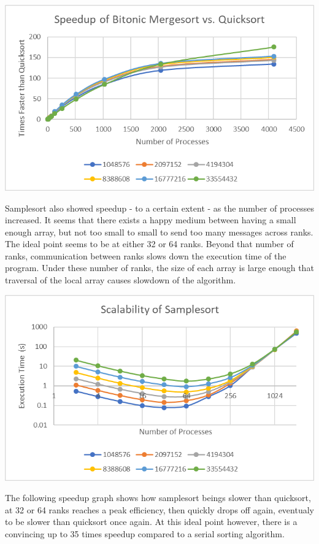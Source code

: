 \documentclass[10pt,letterpaper]{article}
\begin{document}
\begin{multicols}{2}
\begin{center}
\includegraphics[scale=1.3]{bitonic_speedup}
\end{center}

Samplesort also showed speedup - to a certain extent - as the number of processes increased. It seems that there exists a happy medium between having a small enough array, but not too small to small to send too many messages across ranks. The ideal point seems to be at either 32 or 64 ranks. Beyond that number of ranks, communication between ranks slows down the execution time of the program. Under these number of ranks, the size of each array is large enough that traversal of the local array causes slowdown of the algorithm.

\begin{center}
\includegraphics[scale=1.3]{sample_scale}
\end{center}

The following speedup graph shows how samplesort beings slower than quicksort, at 32 or 64 ranks reaches a peak efficiency, then quickly drops off again, eventualy to be slower than quicksort once again. At this ideal point however, there is a convincing up to 35 times speedup compared to a serial sorting algorithm.


\end{multicols}
\end{document}
